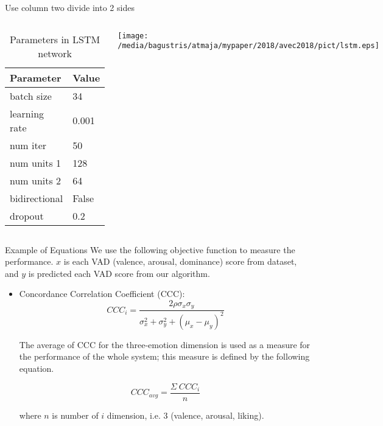 \documentclass{beamer}
\begin{document}
\begin{frame}[t, fragile]{Use column two divide into 2 sides}
\begin{columns}
\begin{table}
  \caption{Parameters in LSTM network}
  \label{tab:lstm}
  \begin{tabular}{ll}
    \hline
    Parameter & Value \\
    \hline
    batch size    & 34       \\
    learning rate & 0.001    \\
    num iter      & 50      \\
    num units 1   & 128     \\
    num units 2   & 64      \\
    bidirectional & False    \\
    dropout       & 0.2     \\
    \hline
\end{tabular}
\end{table}
\texttt{[image: /media/bagustris/atmaja/mypaper/2018/avec2018/pict/lstm.eps]}
\end{columns}
\end{frame}

\begin{frame}[t, fragile]{Example of Equations}
We use the following objective function to measure the performance.
$x$ is each VAD (valence, arousal, dominance) score from dataset, 
and $y$ is predicted each VAD score from our algorithm.

\begin{itemize}
\item Concordance Correlation Coefficient (CCC): 
\begin{equation}
	CCC_i = \dfrac{2\rho \sigma_x \sigma_y}
			{\sigma_x^2 + \sigma_y^2 + (\mu_x - \mu_y)^2}
\label{eq:ccc}
\end{equation}

The average of CCC for the three-emotion dimension is used as a measure for the performance of the whole system; 
this measure is defined by the following equation.  

\begin{equation}
	CCC_{avg} = \dfrac {\Sigma~CCC_i}{n}
\end{equation}

\noindent
where $n$ is number of $i$ dimension, i.e. 3 (valence, arousal, liking).
\end{itemize}
\end{frame}
\end{document}
